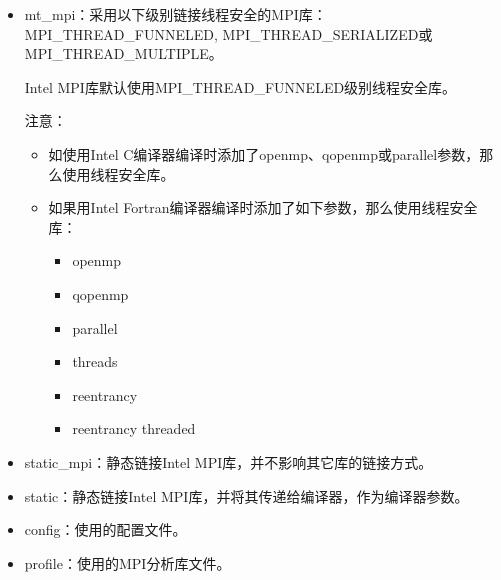\documentclass[a4paper,12pt,english]{sphinxmanual}
\begin{document}
\label{\detokenize{mpi-application/mpi-application:id9}}\begin{itemize}
\item {} 
\sphinxAtStartPar
\sphinxhyphen{}mt\_mpi：采用以下级别链接线程安全的MPI库：MPI\_THREAD\_FUNNELED, MPI\_THREAD\_SERIALIZED或MPI\_THREAD\_MULTIPLE。

\sphinxAtStartPar
Intel MPI库默认使用MPI\_THREAD\_FUNNELED级别线程安全库。

\sphinxAtStartPar
注意：
\begin{itemize}
\item {} 
\sphinxAtStartPar
如使用Intel C编译器编译时添加了\sphinxhyphen{}openmp、\sphinxhyphen{}qopenmp或\sphinxhyphen{}parallel参数，那么使用线程安全库。

\item {} 
\sphinxAtStartPar
如果用Intel Fortran编译器编译时添加了如下参数，那么使用线程安全库：
\begin{itemize}
\item {} 
\sphinxAtStartPar
\sphinxhyphen{}openmp

\item {} 
\sphinxAtStartPar
\sphinxhyphen{}qopenmp

\item {} 
\sphinxAtStartPar
\sphinxhyphen{}parallel

\item {} 
\sphinxAtStartPar
\sphinxhyphen{}threads

\item {} 
\sphinxAtStartPar
\sphinxhyphen{}reentrancy

\item {} 
\sphinxAtStartPar
\sphinxhyphen{}reentrancy threaded

\end{itemize}

\end{itemize}

\item {} 
\sphinxAtStartPar
\sphinxhyphen{}static\_mpi：静态链接Intel MPI库，并不影响其它库的链接方式。

\item {} 
\sphinxAtStartPar
\sphinxhyphen{}static：静态链接Intel MPI库，并将其传递给编译器，作为编译器参数。

\item {} 
\sphinxAtStartPar
\sphinxhyphen{}config：使用的配置文件。

\item {} 
\sphinxAtStartPar
\sphinxhyphen{}profile：使用的MPI分析库文件。


\end{itemize}
\end{document}
